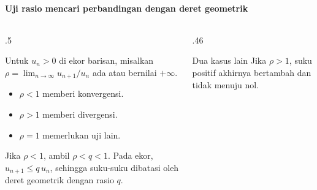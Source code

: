 \documentclass{../../kalkulus-ppt}
\begin{document}
\begin{frame}{\insertsection}
    \framesubtitle{Uji rasio mencari perbandingan dengan deret geometrik}
    \begin{columns}[c,onlytextwidth]
        \begin{column}{.5\textwidth}
            \begin{teorema}
                Untuk $u_n>0$ di ekor barisan, misalkan
                $\rho=\lim_{n\to\infty}u_{n+1}/u_n$ ada
                atau bernilai $+\infty$.
                \begin{itemize}
                    \item $\rho<1$ memberi konvergensi.
                    \item $\rho>1$ memberi divergensi.
                    \item $\rho=1$ memerlukan uji lain.
                \end{itemize}
            \end{teorema}
            Jika $\rho<1$, ambil $\rho<q<1$. Pada ekor,
            $u_{n+1}\le q\,u_n$, sehingga suku-suku dibatasi
            oleh deret geometrik dengan rasio $q$.
        \end{column}
        \begin{column}{.46\textwidth}
            \begin{block}{Dua kasus lain}
                Jika $\rho>1$, suku positif akhirnya bertambah
                dan tidak menuju nol.
            \end{block}
        \end{column}
    \end{columns}
\end{frame}
\end{document}
